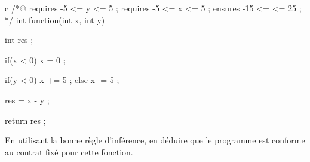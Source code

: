 \begin{CodeBlock}{c}
/*@
  requires -5 <= y <= 5 ;
  requires -5 <= x <= 5 ;
  ensures  -15 <= \result <= 25 ;
*/
int function(int x, int y){
  int res ;

  if(x < 0){
    x = 0 ;
  }

  if(y < 0){
    x += 5 ;
  } else {
    x -= 5 ;
  }

  res = x - y ;

  return res ;
}
\end{CodeBlock}



En utilisant la bonne règle d'inférence, en déduire que le programme est
conforme au contrat fixé pour cette fonction.
